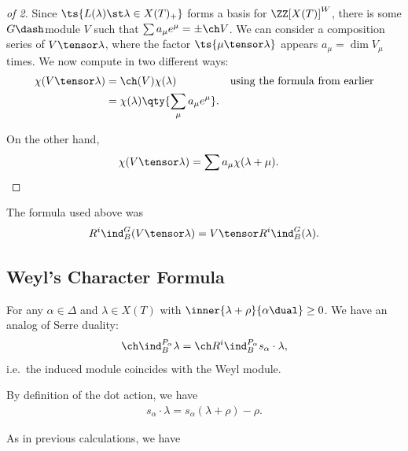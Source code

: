 \begin{proof}[of 2]

Since \(\ts{L(\lambda) \st \lambda\in X(T)_+}\) forms a basis for
\(\ZZ[X(T)]^W\), there is some \(G\dash\)module \(V\) such that
\(\sum a_\mu e^\mu = \pm \ch V\). We can consider a composition series
of \(V\tensor \lambda\), where the factor \(\ts{\mu \tensor \lambda}\)
appears \(a_\mu = \dim V_\mu\) times. We now compute in two different
ways:
\begin{align*}  
\chi(V\tensor \lambda) 
&= \ch(V) \chi(\lambda)  && \text{using the formula from earlier} \\
&= \chi(\lambda) \qty{ \sum_\mu a_\mu e^\mu }
.\end{align*}

On the other hand,
\begin{align*}  
\chi(V\tensor \lambda) &=
\sum a_\mu \chi(\lambda + \mu)
.\end{align*}

\end{proof}

\begin{remark}

The formula used above was
\begin{align*}  
R^i \ind_B^G (V\tensor \lambda) = V\tensor R^i \ind_B^G(\lambda)
.\end{align*}

\end{remark}

\hypertarget{weyls-character-formula-1}{%
\subsection{Weyl's Character Formula}\label{weyls-character-formula-1}}

For any \(\alpha\in\Delta\) and \(\lambda \in X(T)\) with
\(\inner{\lambda + \rho}{\alpha\dual} \geq 0\). We have an analog of
Serre duality:
\begin{align*}  
\ch \ind_B^{P_\alpha} \lambda = \ch R^i \ind_B^{P_\alpha} s_\alpha \cdot \lambda
,\end{align*} i.e.~the induced module coincides with the Weyl module.

By definition of the dot action, we have
\begin{align*}  
s_\alpha \cdot \lambda = s_\alpha(\lambda + \rho) - \rho
.\end{align*}

As in previous calculations, we have

